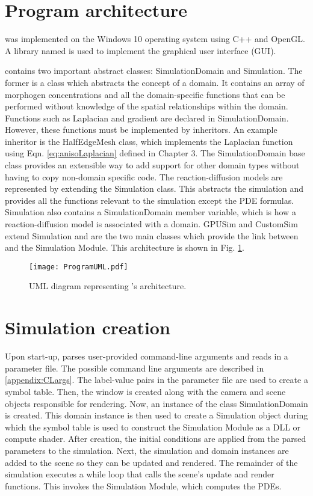 \section{Program architecture} 
\ProgramName{} was implemented on the Windows 10 operating system using C++ and OpenGL. A library named  \citep{cornut2019} is used to implement the graphical user interface (GUI). 

\ProgramName{} contains two important abstract classes: SimulationDomain and Simulation. The former is a class which abstracts the concept of a domain. It contains an array of morphogen concentrations and all the domain-specific functions that can be performed without knowledge of the spatial relationships within the domain. Functions such as Laplacian and gradient are declared in SimulationDomain. However, these functions must be implemented by inheritors. An example inheritor is the HalfEdgeMesh class, which implements the Laplacian function using Eqn. \ref{eq:anisoLaplacian} defined in Chapter 3. The SimulationDomain base class provides an extensible way to add support for other domain types without having to copy non-domain specific code. The reaction-diffusion models are represented by extending the Simulation class. This abstracts the simulation and provides all the functions relevant to the simulation except the PDE formulas. Simulation also contains a SimulationDomain member variable, which is how a reaction-diffusion model is associated with a domain. GPUSim and CustomSim extend Simulation and are the two main classes which provide the link between \ProgramName{} and the Simulation Module. This architecture is shown in Fig. \ref{fig:umlDiagram}.

\begin{figure}[H]
	\centering
	\texttt{[image: ProgramUML.pdf]}
	\caption{UML diagram representing \ProgramName{}'s architecture.}
	\label{fig:umlDiagram}
\end{figure}

\section{Simulation creation}
Upon start-up, \ProgramName{} parses user-provided command-line arguments and reads in a parameter file. The possible command line arguments are described in \ref{appendix:CLargs}. The label-value pairs in the parameter file are used to create a symbol table. Then, the window is created along with the camera and scene objects responsible for rendering. Now, an instance of the class SimulationDomain is created. This domain instance is then used to create a Simulation object during which the symbol table is used to construct the Simulation Module as a DLL or compute shader. After creation, the initial conditions are applied from the parsed parameters to the simulation. Next, the simulation and domain instances are added to the scene so they can be updated and rendered. The remainder of the simulation executes a while loop that calls the scene's update and render functions. This invokes the Simulation Module, which computes the PDEs.

